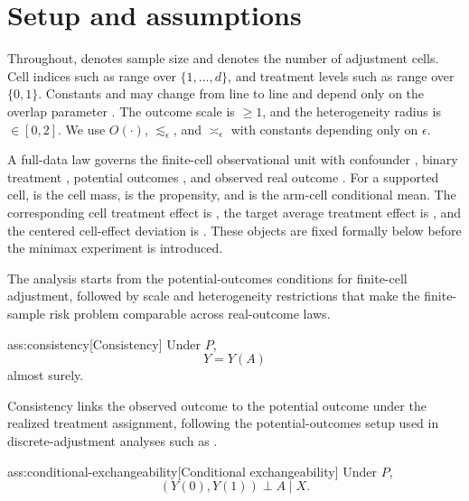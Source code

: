 \section{Setup and assumptions}

Throughout,  denotes sample size and  denotes the number of adjustment cells. Cell indices such as  range over \(\{1,\ldots,d\}\), and treatment levels such as  range over \(\{0,1\}\). Constants  and  may change from line to line and depend only on the overlap parameter . The outcome scale is \(\ge 1\), and the heterogeneity radius is \(\in[0,2]\). We use \(O(\cdot)\), \(\lesssim_\epsilon\), and \(\asymp_\epsilon\) with constants depending only on \(\epsilon\).

A full-data law  governs the finite-cell observational unit with confounder , binary treatment , potential outcomes , and observed real outcome . For a supported cell,  is the cell mass,  is the propensity, and  is the arm-cell conditional mean. The corresponding cell treatment effect is , the target average treatment effect is , and the centered cell-effect deviation is . These objects are fixed formally below before the minimax experiment is introduced.

The analysis starts from the potential-outcomes conditions for finite-cell adjustment, followed by scale and heterogeneity restrictions that make the finite-sample risk problem comparable across real-outcome laws.

\begin{assumptionv}{ass:consistency}[Consistency]
Under \(P\),
\[
Y=Y(A)
\]
almost surely.
\end{assumptionv}

Consistency links the observed outcome to the potential outcome under the realized treatment assignment, following the potential-outcomes setup used in discrete-adjustment analyses such as \citet{ZengBalakrishnanHanKennedy2024}.

\begin{assumptionv}{ass:conditional-exchangeability}[Conditional exchangeability]
Under \(P\),
\[
(Y(0),Y(1))\perp A\mid X .
\]
\end{assumptionv}

